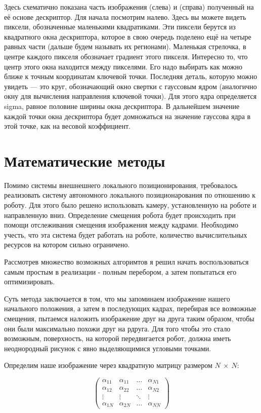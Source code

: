 \documentclass[a4paper,12pt]{article}
\begin{document}
Здесь схематично показана часть изображения (слева) и (справа) полученный на её основе дескриптор. Для начала посмотрим налево. Здесь вы можете видеть пиксели, обозначенные маленькими квадратиками. Эти пиксели берутся из квадратного окна дескриптора, которое в свою очередь поделено ещё на четыре равных части (дальше будем называть их регионами). Маленькая стрелочка, в центре каждого пикселя обозначает градиент этого пикселя. Интересно то, что центр этого окна находится между пикселями. Его надо выбирать как можно ближе к точным координатам ключевой точки. Последняя деталь, которую можно увидеть — это круг, обозначающий окно свертки с гауссовым ядром (аналогично окну для вычисления направления ключевой точки). Для этого ядра определяется sigma, равное половине ширины окна дескриптора. В дальнейшем значение каждой точки окна дескриптора будет домножаться на значение гауссова ядра в этой точке, как на весовой коэффициент.

\section{Математические методы}
Помимо системы внешнешнего локального позиционирования, требовалось реализовать систему автономного локального позиционарования по отношению к роботу. Для этого было решено использовать камеру, установленную на роботе и направленную вниз. Определение смещения робота будет происходить при помощи отслеживания смещения изображения между кадрами. Необходимо учесть, что эта система будет работать на роботе, количество вычислительных ресурсов на котором сильно ограничено.

Рассмотрев множество возможных алгоримтов я решил начать воспользоваться самым простым в реализации - полным перебором, а затем попытаться его оптимизировать.

Суть метода заключается в том, что мы запоминаем изображение нашего начального положения, а затем в последующих кадрах, перебирая все возможные смещения, пытаемся наложить изображение друг на друга таким образом, чтобы они были максимально похожи друг на рдруга. Для того чтобы это стало возможным, поверхность, на которой передвигается робот, должна иметь неоднородный рисунок с явно выделяющимися угловыми точками. 

Определим наше изображение через квадратную матрицу размером $N~\times~N$:

\begin{equation}
\begin{pmatrix}
\label{eq:mat_a}
\alpha_{11}& \alpha_{11}& \dots& \alpha_{N1} \\
\alpha_{12}& \alpha_{22}& \dots& \alpha_{N2} \\
\vdots& \vdots& \ddots& \vdots \\
\alpha_{1N}& \alpha_{2N}& \dots& \alpha_{NN}
\end{pmatrix}
\end{equation}
\end{document}
